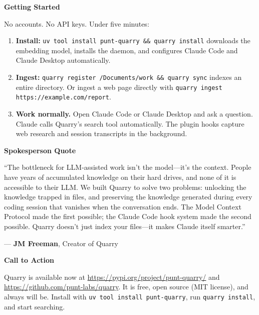 \documentclass[11pt,letterpaper]{article}
\newcommand{\prsection}[1]{%
  \vspace{1em}%
  {\large\bfseries\color{SectionBlue}#1}%
  \vspace{0.3em}\par%
}
\begin{document}
\prsection{Getting Started}

No accounts. No API keys. Under five minutes:

\begin{enumerate}[leftmargin=2em]
  \item \textbf{Install:} {\small\texttt{uv tool install punt-quarry \&\& quarry install}}
        downloads the embedding model, installs the daemon, and configures
        Claude Code and Claude Desktop automatically.
  \item \textbf{Ingest:} \texttt{quarry register \texttildelow/Documents/work
        \&\& quarry sync} indexes an entire directory. Or ingest a web page
        directly with \texttt{quarry ingest https://example.com/report}.
  \item \textbf{Work normally.} Open Claude Code or Claude Desktop and ask a
        question. Claude calls Quarry's search tool automatically. The plugin
        hooks capture web research and session transcripts in the background.
\end{enumerate}

\prsection{Spokesperson Quote}

\begin{spokespersonquote}
``The bottleneck for LLM-assisted work isn't the model---it's the context. People
have years of accumulated knowledge on their hard drives, and none of it is
accessible to their LLM. We built Quarry to solve two problems: unlocking the
knowledge trapped in files, and preserving the knowledge generated during every
coding session that vanishes when the conversation ends. The Model Context
Protocol made the first possible; the Claude Code hook system made the second
possible. Quarry doesn't just index your files---it makes Claude itself
smarter.''

\raggedleft --- \textbf{JM Freeman}, Creator of Quarry
\end{spokespersonquote}

\prsection{Call to Action}

Quarry is available now at \url{https://pypi.org/project/punt-quarry/} and
\url{https://github.com/punt-labs/quarry}. It is free, open source (MIT
license), and always will be. Install with \texttt{uv tool install punt-quarry},
run \texttt{quarry install}, and start searching.

\newpage

\end{document}
